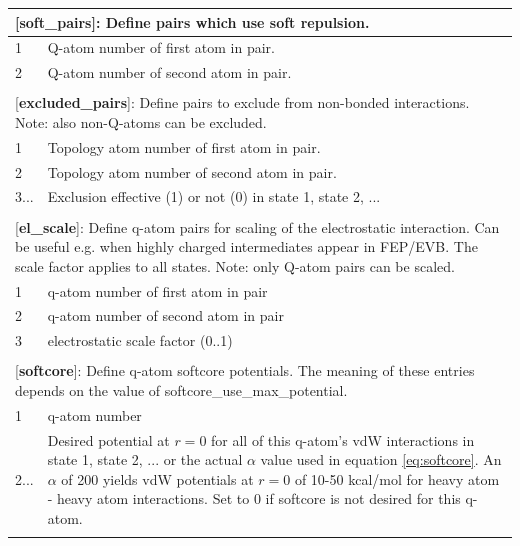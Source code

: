 \documentclass[10pt,oneside,pdftex]{article}
\begin{document}
\begin{longtable}{|p{53pt}|p{181pt}|p{160pt}|}
\multicolumn{3}{p{394pt}}{[\textbf{soft\_pairs}]: Define pairs which use soft repulsion.}\\
\hline 1 & \multicolumn{2}{p{341pt}|}{Q-atom number of first atom in pair.}\\
\hline 2 & \multicolumn{2}{p{341pt}|}{Q-atom number of second atom in pair.}\\
\hline
\multicolumn{3}{p{394pt}}{}\\

\multicolumn{3}{p{394pt}}{[\textbf{excluded\_pairs}]: Define pairs to exclude from non-bonded interactions. Note: also non-Q-atoms can be excluded.}\\
\hline 1 & \multicolumn{2}{p{341pt}|}{Topology atom number of first atom in pair.}\\
\hline 2 & \multicolumn{2}{p{341pt}|}{Topology atom number of second atom in pair.}\\
\hline 3... & \multicolumn{2}{p{341pt}|}{Exclusion effective (1) or not (0) in state 1, state 2, ...}\\
\hline
\multicolumn{3}{p{394pt}}{}\\

\multicolumn{3}{p{394pt}}{[\textbf{el\_scale}]: Define q-atom pairs for scaling of the electrostatic interaction. Can be useful e.g. when highly charged intermediates appear in FEP/EVB. The scale factor applies to all states. Note: only Q-atom pairs can be scaled.}\\
\hline 1 & \multicolumn{2}{p{341pt}|}{q-atom number of first atom in pair}\\
\hline 2 & \multicolumn{2}{p{341pt}|}{q-atom number of second atom in pair}\\
\hline 3 & \multicolumn{2}{p{341pt}|}{electrostatic scale factor (0..1)}\\
\hline
\multicolumn{3}{p{394pt}}{}\\

\multicolumn{3}{p{394pt}}{[\textbf{softcore}]: Define q-atom softcore potentials. The meaning of these entries depends on the value of softcore\-\_use\-\_max\-\_potential.}\\
\hline 1 & \multicolumn{2}{p{341pt}|}{q-atom number}\\
\hline 2... & \multicolumn{2}{p{341pt}|}{Desired potential at $r=0$ for all of this q-atom's vdW interactions in state 1, state 2, ... or the actual $\alpha$ value used in equation \ref{eq:softcore}. An $\alpha$ of 200 yields vdW potentials at $r=0$ of 10-50 kcal/mol for heavy atom - heavy atom interactions. Set to 0 if softcore is not desired for this q-atom. }\\
\hline
\multicolumn{3}{p{394pt}}{}\\


\end{longtable}
\end{document}
